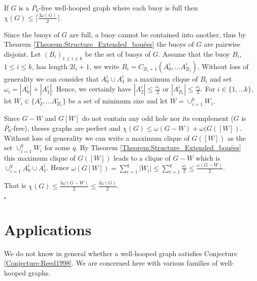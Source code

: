 \documentclass{amsart}
\theoremstyle{definition}
\theoremstyle{remark}
\newenvironment{prf}{{\bf \noindent Proof. } }{\hfill$\square$\\}
\newcommand{\wh}{well-hooped\xspace}
\newcommand{\extB}{buoy\xspace}
\begin{document}
\begin{thm} \label{Theorem:Full_Buoy} If $G$ is a $\overline{P_6}$-free \wh graph where each \extB is full then $\chi(G) \leq \lceil \frac{3\omega(G)}{2}\rceil$.
\end{thm}

\begin{prf}
Since the buoys of $G$ are full, a buoy cannot be contained into another, thus  by Theorem \ref{Theorem:Structure_Extended_bouées} the buoys of $G$ are pairwise disjoint. 
Let $(B_i)_{1\leq i\leq k}$ be the set of buoys of $G$. Assume that the buoy $B_i$, $1\leq i\leq k$, has length $2l_i+1$, we write $B_i=C_{2l_i+1}(A^i_0,\ldots A^i_{2l_i})$. 
Without loss of generality we can consider that $A^i_0\cup A^i_1$ is a maximum clique of $B_i$ and set  $\omega_i=|A^i_0|+|A^i_1|$. Hence, we certainly have $|A^i_2|\leq\frac{\omega_i}{2}$ or $|A^i_{2l_i}|\leq\frac{\omega_i}{2}$.
For $i\in\{1,\ldots k\}$, let $W_i\in\{A^i_2,\ldots A^i_{2l_i}\}$ be a set of minimum size and let $W=\cup_{i=1}^{k}W_{i}$.

Since $G-W$ and $G[W]$ do not contain any odd hole nor its complement ($G$ is $\overline{P_6}$-free), theses graphs are perfect
and $\chi(G)\leq\omega(G-W)+\omega(G([W])$. Without loss of generality we can write a maximum clique of $G([W])$ as the set $\cup_{i=1}^{q} W_{i}$ for some $q$. By Theorem \ref{Theorem:Structure_Extended_bouées} 
this maximum clique of $G([W])$ leads to a clique of $G-W$ which is $\cup_{i=1}^{q} A^i_0 \cup A^i_1$. Hence $\omega(G[W])=\sum_{i=1}^{q} |W_{i}| \leq \sum_{i=1}^{q} \frac{\omega_{i}}{2} \leq \frac{\omega(G-W)}{2}$.

That is $\chi(G) \leq \frac{3\omega(G-W)}{2} \leq \frac{3\omega(G)}{2} $.


\end{prf}


\section{Applications}

We do not know in general whether a \wh graph  satisfies Conjecture \ref{Conjecture:Reed1998}. 
We are concerned here with various families of \wh graphs.
\end{document}
